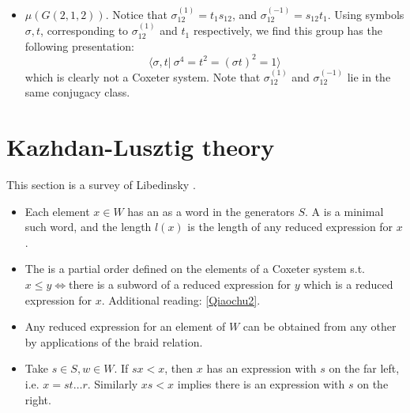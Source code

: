 \begin{definition}
\begin{itemize}
    \item  $\mu(G(2,1,2))$. Notice that $\sigma_{12}^{(1)}=t_1 s_{12}$,  and $\sigma_{12}^{(-1)}=s_{12}t_1$. Using symbols $\sigma,t$, corresponding to $\sigma_{12}^{(1)}$ and $t_1$ respectively, we find this group has the following presentation:
    $$\langle \sigma,t|\ \sigma^4=t^2=(\sigma t)^2=1\rangle$$
    which is clearly not a Coxeter system. Note that $\sigma_{12}^{(1)}$ and $\sigma_{12}^{(-1)}$ lie in the same conjugacy class.
\end{itemize}
\end{definition}

\section{Kazhdan-Lusztig theory}\label{kazhdan_sec}
This section is a survey of Libedinsky \cite{Libedinsky2017GentleIT}.
\begin{definition}
  \begin{itemize}
    \item Each element $x\in W$ has an  as a word in the generators $S$. A  is a minimal such word, and the length $l(x)$ is the length of any reduced expression for $x$.
    \item The  is a partial order defined on the elements of a Coxeter system s.t. $x\leq y\iff$there is a subword of a reduced expression for $y$ which is a reduced expression for $x$. Additional reading: \hyperlink{https://qchu.wordpress.com/2010/07/11/chevalley-bruhat-order/}{[Qiaochu2]}.
  \end{itemize}
\end{definition}

\begin{proposition}\label{reduced_braid}\begin{itemize}
  \item Any reduced expression for an element of $W$ can be obtained from any other by applications of the braid relation.
  \item Take $s\in S,w\in W$. If $sx<x$, then $x$ has an expression with $s$ on the far left, i.e. $x=st\dots r$. Similarly $xs<x$ implies there is an expression with $s$ on the right.
\end{itemize}
\end{proposition}

